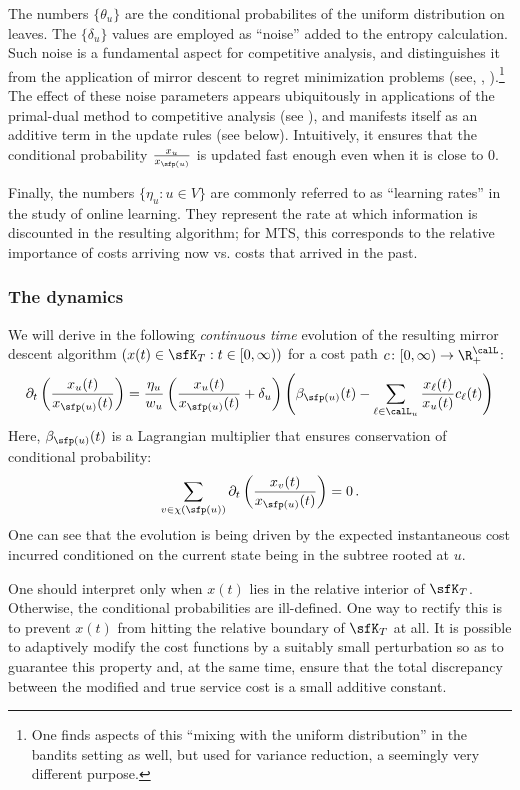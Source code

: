 The numbers $\{\theta_u\}$ are the conditional probabilites of the uniform distribution on leaves.
The $\{\delta_u\}$ values
are employed as ``noise'' added to the entropy calculation.
Such noise is a fundamental aspect for competitive analysis, and distinguishes it from the application
of mirror descent to regret minimization problems (see, \eg, \cite{BN12}).\footnote{One finds aspects of this ``mixing with the uniform distribution''
	in the bandits setting as well, but used for variance reduction, a seemingly very different purpose.}
The effect of these noise parameters appears ubiquitously in applications of the primal-dual method to competitive analysis (see \cite{BN07}),
and manifests itself as an additive term in the update rules (see  below). Intuitively, it ensures that the conditional probability $\frac{x_u}{x_{\sfp(u)}}$ is updated fast enough even when it is close to $0$.

Finally, the numbers $\{\eta_u : u \in V\}$ are commonly referred to as ``learning rates'' in 
the study of online learning.  They represent the rate at which information is discounted in the resulting algorithm;
for MTS, this corresponds to the relative importance of costs arriving now vs. costs that arrived in the past.

\subsubsection{The dynamics}
\label{sec:dyn}

We will derive in  the following \emph{continuous time} evolution of the resulting mirror descent algorithm $\left(x(t) \in \sfK_T : t \in [0,\infty)\right)$ for a cost path $c\colon[0,\infty)\to \R_+^{\calL}$:
\begin{equation}\label{eq:evo}
\partial_t \left(\frac{x_u(t)}{x_{\sfp(u)}(t)}\right) = \frac{\eta_u}{w_u} \left(\frac{x_u(t)}{x_{\sfp(u)}(t)}+\delta_u\right)
\left(\beta_{\sfp(u)}(t) - \sum_{\ell \in \calL_u} \frac{x_{\ell}(t)}{x_u(t)} c_{\ell}(t)\right)
\end{equation}
Here, $\beta_{\sfp(u)}(t)$ is a Lagrangian multiplier that ensures conservation of conditional probability:
\[
\sum_{v \in \chi(\sfp(u))} \partial_t \left(\frac{x_v(t)}{x_{\sfp(u)}(t)}\right) = 0\,.
\]
One can see that the evolution is being driven by the expected instantaneous
cost incurred conditioned on the current state being in the subtree rooted at $u$.

One should interpret  only when $x(t)$ lies in the relative interior of $\sfK_T$. Otherwise,
the conditional probabilities are ill-defined.
One way to rectify this is to
prevent $x(t)$ from hitting the relative boundary of $\sfK_T$ at all.
It is possible to adaptively modify the cost functions by a suitably small perturbation so as to guarantee
this property and, at the same time, ensure that the total discrepancy between
the modified and true service cost
is a small additive constant.

